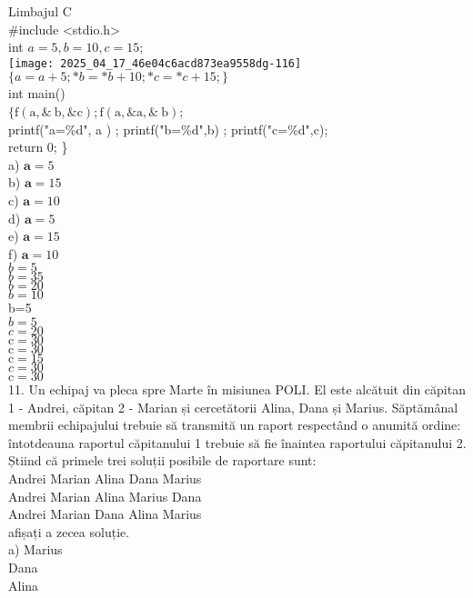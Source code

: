 Limbajul C\\
\#include <stdio.h>\\
int $a=5, b=10, c=15$;\\
\texttt{[image: 2025\_04\_17\_46e04c6acd873ea9558dg-116]}\\
$\{a=a+5 ; * b=* b+10 ; * c=* c+15 ;\}$\\
int main()\\
$\{\mathrm{f}(\mathrm{a}, \& \mathrm{~b}, \& \mathrm{c}) ; \mathrm{f}(\mathrm{a}, \& \mathrm{a}, \& \mathrm{~b})$;\\
printf("a=\%d", a ) ; printf("b=\%d",b) ; printf("c=\%d",c);\\
return 0; \}\\
a) $\mathbf{a}=5$\\
b) $\mathbf{a}=15$\\
c) $\mathbf{a}=10$\\
d) $\mathbf{a}=5$\\
e) $\mathbf{a}=15$\\
f) $\mathbf{a}=10$\\
$b=5$\\
$b=35$\\
$b=20$\\
$b=10$\\
b=5\\
$b=5$\\
$c=20$\\
$\mathrm{c}=30$\\
$\mathrm{c}=30$\\
$\mathrm{c}=15$\\
$c=30$\\
$\mathrm{c}=30$\\
11. Un echipaj va pleca spre Marte în misiunea POLI. El este alcătuit din căpitan 1 - Andrei, căpitan 2 - Marian și cercetătorii Alina, Dana și Marius. Săptămânal membrii echipajului trebuie să transmită un raport respectând o anumită ordine: întotdeauna raportul căpitanului 1 trebuie să fie înaintea raportului căpitanului 2. Știind că primele trei soluții posibile de raportare sunt:\\
Andrei Marian Alina Dana Marius\\
Andrei Marian Alina Marius Dana\\
Andrei Marian Dana Alina Marius\\
afișați a zecea soluție.\\
a) Marius\\
Dana\\
Alina\\
